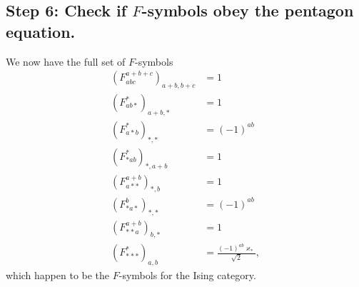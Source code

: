 \subsection*{Step 6: Check if $F$-symbols obey the pentagon equation.} 
We now have the full set of $F$-symbols
	\begin{align*}
		\left(F_{abc}^{a+b+c}\right)_{a+b,b+c}&=1\\
		\left(F_{ab*}^*\right)_{a+b,*}&=1\\
		\left(F_{a*b}^*\right)_{*,*}&=(-1)^{ab}\\
		\left(F_{*ab}^*\right)_{*,a+b}&=1\\
		\left(F_{a**}^{a+b}\right)_{*,b}&=1\\
		\left(F_{*a*}^b\right)_{*,*}&=(-1)^{ab}\\
		\left(F_{**a}^{a+b}\right)_{b,*}&=1\\
		\left(F_{***}^*\right)_{a,b}&=\frac{(-1)^{ab}\varkappa_*}{\sqrt{2}},
	\end{align*}
which happen to be the $F$-symbols for the Ising category. 